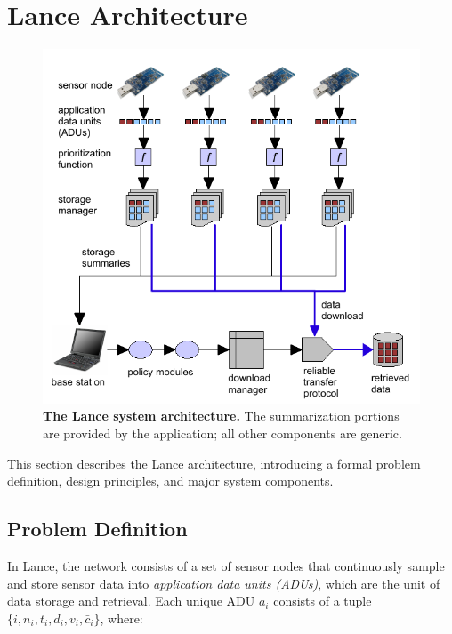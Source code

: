 \section{Lance Architecture}
\label{lance-sec-architecture}

\begin{figure}[t]
\begin{center}
\includegraphics[width=0.8\hsize]{./4-lance/figs/architecture.pdf}
\end{center}

\caption{\textbf{The Lance system architecture.} The summarization portions
are provided by the application; all other components are generic.}

\label{lance-fig-architecture}
\end{figure}

This section describes the Lance architecture, introducing a formal problem
definition, design principles, and major system components.

\subsection{Problem Definition}
\label{lance-sec-problem-definition}

In Lance, the network consists of a set of sensor nodes that continuously
sample and store sensor data into \textit{application data units (ADUs)},
which are the unit of data storage and retrieval. Each unique ADU $a_i$
consists of a tuple $\{ i, n_i, t_i, d_i, v_i, \bar{c}_i \}$, where:


